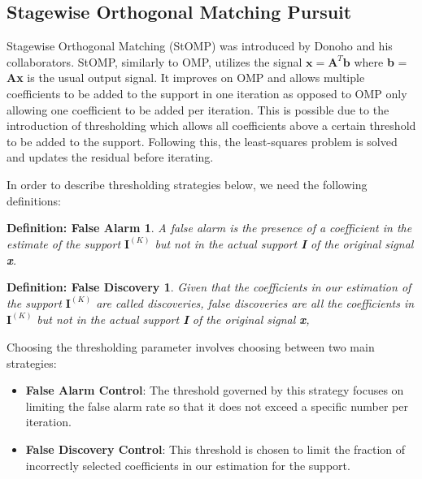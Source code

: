 \documentclass[titlepage,oneside, 12pt]{book}
\theoremstyle{break}
\begin{document}
\newpage
\subsection{Stagewise Orthogonal Matching Pursuit}
Stagewise Orthogonal Matching (StOMP) was introduced by Donoho and his collaborators\cite{STOMP}. StOMP, similarly to OMP, utilizes the signal $\textbf{x} = \textbf{A}^{T}\textbf{b}$ where \textbf{b} = \textbf{Ax} is the usual output signal. It improves on OMP and allows multiple coefficients to be added to the support in one iteration as opposed to OMP only allowing one coefficient to be added per iteration. This is possible due to the introduction of thresholding which allows all coefficients above a certain threshold to be added to the support. Following this, the least-squares problem is solved and updates the residual before iterating.  

In order to describe thresholding strategies below, we need the following definitions:

\newtheorem*{FA}{Definition: False Alarm}
\begin{FA}
A false alarm is the presence of a coefficient in the estimate of the support $\textbf{I}^{(K)} $ but not in the actual support \textbf{I} of the original signal \textbf{x}. 
\end{FA}

\newtheorem*{FD}{Definition: False Discovery}
\begin{FD}
Given that the coefficients in our estimation of the support $\textbf{I}^{(K)}$ are called discoveries, false discoveries are all the coefficients in $\textbf{I}^{(K)}$ but not in the actual support \textbf{I} of the original signal  \textbf{x}, 
\end{FD}



Choosing the thresholding parameter involves choosing between two main strategies:



\begin{itemize}
\item[1] \textbf{False Alarm Control}: The threshold governed by this strategy focuses on limiting the false alarm rate so that it does not exceed a specific number per iteration.

\item[2] \textbf{False Discovery Control}: This threshold is chosen to limit the fraction of incorrectly selected  coefficients in our estimation for the support. 

\end{itemize} 
\end{document}
